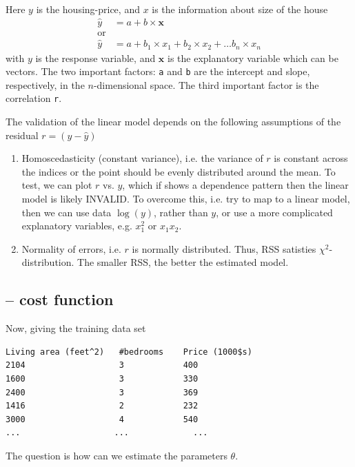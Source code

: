 Here $y$ is the housing-price, and $x$ is the information about size of the
house
\begin{equation}
\begin{split}
\hat{y} &= a + b \times \mathbf{x} \\
\text{or} \\
\hat{y} &= a + b_1 \times x_1 + b_2 \times x_2 + \ldots b_n \times x_n
\end{split}
\end{equation}
with $y$ is the response variable, and $\mathbf{x}$ is the explanatory
variable which can be vectors. The two important factors: \verb!a! and \verb!b! are the
intercept and slope, respectively, in the $n$-dimensional space. The third
important factor is the correlation \verb!r!.

\begin{framed}
The validation of the linear model depends on the following assumptions of the
residual $r = (y-\hat{y})$
\begin{enumerate}
  \item Homoscedasticity (constant variance), i.e. the variance of $r$ is
  constant across the indices or the point should be evenly distributed around
  the mean. To test, we can plot $r$ vs. $y$, which if shows a dependence
  pattern then the linear model is likely INVALID. To overcome this, i.e. try to
  map to a linear model, then we can use data $\log(y)$, rather than $y$, or use
  a more complicated explanatory variables, e.g. $x_1^2$ or $x_1x_2$.
   
  \item Normality of errors, i.e. $r$ is normally distributed. Thus, RSS
  satisties $\chi^2$-distribution. The smaller RSS, the better the estimated
  model.
\end{enumerate}
\end{framed}

\subsection{-- cost function}

Now, giving the training data set
\begin{verbatim}
Living area (feet^2)   #bedrooms    Price (1000$s)
2104                   3            400
1600                   3            330
2400                   3            369
1416                   2            232
3000                   4            540
...                   ...             ...
\end{verbatim}
The question is how can we estimate the parameters $\theta$.

